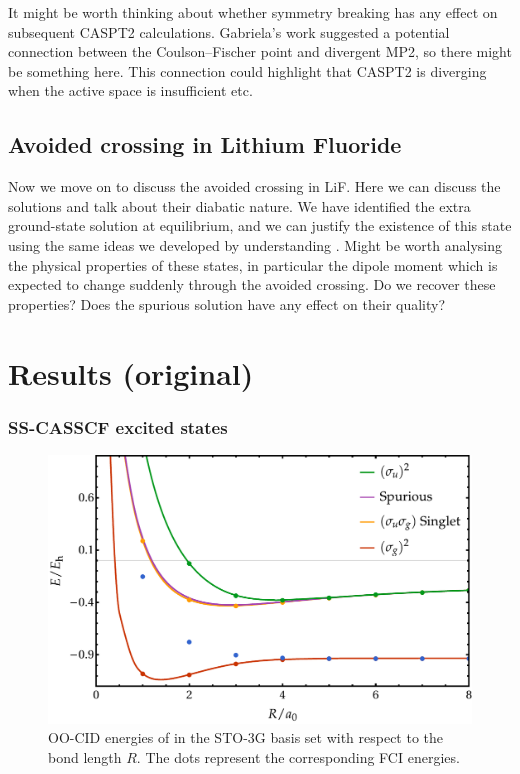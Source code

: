 \documentclass[aip,jcp,reprint,noshowkeys,superscriptaddress]{revtex4-1}
\newcommand{\hugh}[1]{\textcolor{hughgreen}{#1}}
\begin{document}
\hugh{It might be worth thinking about whether symmetry breaking has any effect on subsequent CASPT2 calculations. 
Gabriela's work suggested a potential connection between the Coulson--Fischer point and divergent MP2, so there might 
be something here.
This connection could highlight that CASPT2 is diverging when the active space is insufficient etc.
}

\subsection{Avoided crossing in Lithium Fluoride}

\hugh{Now we move on to discuss the avoided crossing in LiF. Here we can discuss the 
solutions and talk about their diabatic nature. We have identified the extra ground-state solution 
at equilibrium, and we can justify the existence of this state using the same ideas we developed by 
understanding \ce{H2}.
Might be worth analysing the physical properties of these states, in particular the dipole moment which is expected to
change suddenly through the avoided crossing.
Do we recover these properties? Does the spurious solution have any effect on their quality?
} 

\section{Results (original)}
\label{sec:results}

\subsubsection{SS-CASSCF excited states}
\label{sec:excited}

\begin{figure}
  \centering
  \includegraphics[width=\linewidth]{Figures/fig_1.pdf}
  \caption{
    OO-CID energies of  in the STO-3G basis set with respect to the bond length $R$. The dots represent the corresponding FCI energies.
    \label{fig:fig_1}}
\end{figure}
\end{document}
